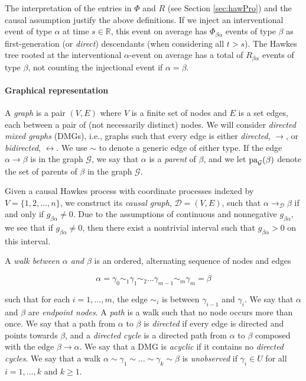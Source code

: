 \documentclass[accepted]{uai2021} %
\newcommand{\pa}{\textnormal{pa}}
\begin{document}
The interpretation of the entries in $\Phi$ and $R$ (see Section 
\ref{sec:hawPro}) and the causal assumption justify the above definitions. If 
we inject an 
interventional event of type $\alpha$ at time $s \in \mathbb{R}$, this 
event on average has $\Phi_{\beta\alpha}$ events 
of type $\beta$ as first-generation (or \emph{direct}) descendants (when 
considering all $t > s$). The Hawkes tree rooted at the 
interventional $\alpha$-event on average has a total of $R_{\beta\alpha}$ 
events of 
type $\beta$, not counting the injectional event if $\alpha=\beta$. 


\paragraph{Graphical representation}

A {\it graph} is a pair $(V,E)$ where $V$ is a finite set of nodes and $E$ is a 
set edges, each between a pair of (not necessarily distinct) nodes. We will  
consider {\it directed mixed graphs} (DMGs), i.e., graphs such that every edge 
is 
either \emph{directed}, $\rightarrow$, or \emph{bidirected}, $\leftrightarrow$. 
We use $\sim$ to denote a generic edge of either type. If the edge 
$\alpha\rightarrow\beta$ is in the graph $\mathcal{G}$, we say that $\alpha$ is 
a \emph{parent} of $\beta$, and we let $\pa_\mathcal{G}(\beta)$ denote the set 
of parents 
of $\beta$ in the graph $\mathcal{G}$.

Given a causal Hawkes process with coordinate processes indexed by $V = 
\{1,2,\ldots,n\}$, we construct its \emph{causal graph}, $\mathcal{D} = (V,E)$, 
such that 
$\alpha \rightarrow_\mathcal{D} \beta$ if and only if $g_{\beta\alpha} \neq 0$. 
Due 
to the assumptions of continuous and nonnegative $g_{\beta\alpha}$, we see 
that if $g_{\beta\alpha}\neq 0$, then there exist a nontrivial interval such 
that $g_{\beta\alpha} > 0$ on this interval.

A {\it walk between $\alpha$ and $\beta$} is an ordered, alternating sequence 
of nodes and edges

$$
\alpha = \gamma_0 \sim_1 \gamma_1 \sim_2 \ldots \gamma_{m-1} \sim_m \gamma_{m} 
= \beta
$$

such that for each $i = 1,\ldots,m$, the edge $\sim_i$ is between 
$\gamma_{i-1}$ and $\gamma_i$. We say that $\alpha$ and $\beta$ are 
\emph{endpoint nodes}. A {\it path} is a walk such that no node occurs 
more than once. We say that a path from $\alpha$ to $\beta$ is \emph{directed} 
if every edge is directed and points towards $\beta$, and a \emph{directed 
cycle} is a directed path from $\alpha$ to $\beta$ composed with the edge 
$\beta\rightarrow\alpha$. We say that a DMG is \emph{acyclic} if it contains no 
\emph{directed cycles}. We say that a walk $\alpha \sim \gamma_1 \sim \ldots 
\sim 
\gamma_k \sim \beta$ is \emph{unobserved} if $\gamma_i \in U$ for all $i = 
1,\ldots, k$ and $k \geq 1$. 
\end{document}
